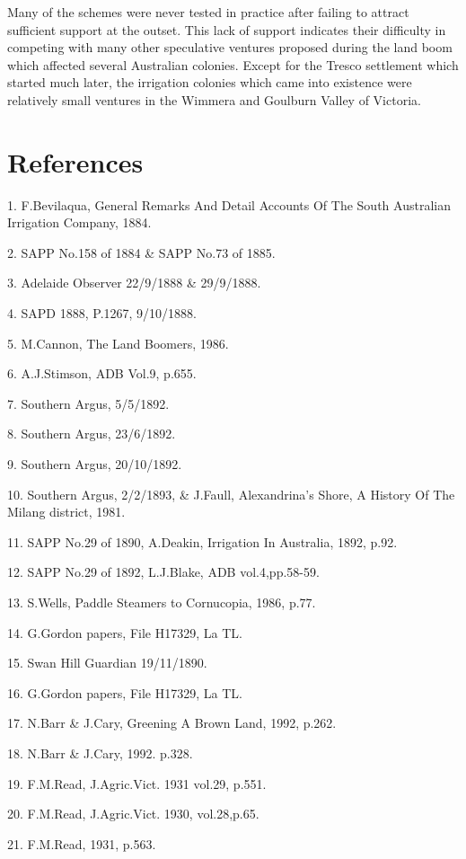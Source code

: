 Many of the schemes were never tested in practice after failing to
attract sufficient support at the outset. This lack of support
indicates their difficulty in competing with many other speculative
ventures proposed during the land boom which affected several
Australian colonies. Except for the Tresco settlement which started
much later, the irrigation colonies which came into existence were
relatively small ventures in the Wimmera and Goulburn Valley of
Victoria.

\section{References}

1. F.Bevilaqua, General Remarks And Detail Accounts Of The South Australian
    Irrigation Company, 1884.

2. SAPP No.158 of 1884 \& SAPP No.73 of 1885.

3. Adelaide Observer 22/9/1888 \& 29/9/1888.

4. SAPD 1888, P.1267, 9/10/1888.

5. M.Cannon, The Land Boomers, 1986.

6. A.J.Stimson, ADB Vol.9, p.655.

7. Southern Argus, 5/5/1892.

8. Southern Argus, 23/6/1892.

9. Southern Argus, 20/10/1892.

10. Southern Argus, 2/2/1893, \& J.Faull, Alexandrina's Shore, A History Of The 
      Milang district, 1981.

11. SAPP No.29 of 1890, A.Deakin, Irrigation In Australia, 1892, p.92.

12. SAPP No.29 of 1892, L.J.Blake, ADB vol.4,pp.58-59.

13. S.Wells, Paddle Steamers to Cornucopia, 1986, p.77.

14. G.Gordon papers, File H17329, La TL.

15. Swan Hill Guardian 19/11/1890.

16. G.Gordon papers, File H17329, La TL.

17. N.Barr \& J.Cary, Greening A Brown Land, 1992, p.262.

18. N.Barr \& J.Cary, 1992. p.328.

19. F.M.Read, J.Agric.Vict. 1931 vol.29, p.551.

20. F.M.Read, J.Agric.Vict. 1930, vol.28,p.65.

21. F.M.Read, 1931, p.563.

